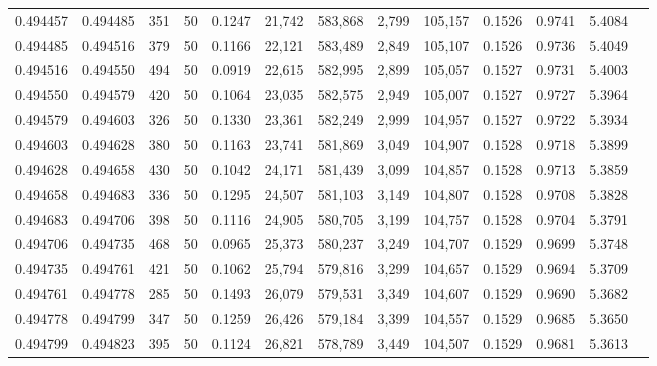\begin{tabular}{rrrrrrrrrrrrr}
0.494457 & 0.494485 & 351 &  50 &                                     0.1247 &  21,742 & 583,868 &   2,799 & 105,157 & 0.1526 & 0.9741 & 5.4084 \\
0.494485 & 0.494516 & 379 &  50 &                                     0.1166 &  22,121 & 583,489 &   2,849 & 105,107 & 0.1526 & 0.9736 & 5.4049 \\
0.494516 & 0.494550 & 494 &  50 &                                     0.0919 &  22,615 & 582,995 &   2,899 & 105,057 & 0.1527 & 0.9731 & 5.4003 \\
0.494550 & 0.494579 & 420 &  50 &                                     0.1064 &  23,035 & 582,575 &   2,949 & 105,007 & 0.1527 & 0.9727 & 5.3964 \\
0.494579 & 0.494603 & 326 &  50 &                                     0.1330 &  23,361 & 582,249 &   2,999 & 104,957 & 0.1527 & 0.9722 & 5.3934 \\
0.494603 & 0.494628 & 380 &  50 &                                     0.1163 &  23,741 & 581,869 &   3,049 & 104,907 & 0.1528 & 0.9718 & 5.3899 \\
0.494628 & 0.494658 & 430 &  50 &                                     0.1042 &  24,171 & 581,439 &   3,099 & 104,857 & 0.1528 & 0.9713 & 5.3859 \\
0.494658 & 0.494683 & 336 &  50 &                                     0.1295 &  24,507 & 581,103 &   3,149 & 104,807 & 0.1528 & 0.9708 & 5.3828 \\
0.494683 & 0.494706 & 398 &  50 &                                     0.1116 &  24,905 & 580,705 &   3,199 & 104,757 & 0.1528 & 0.9704 & 5.3791 \\
0.494706 & 0.494735 & 468 &  50 &                                     0.0965 &  25,373 & 580,237 &   3,249 & 104,707 & 0.1529 & 0.9699 & 5.3748 \\
0.494735 & 0.494761 & 421 &  50 &                                     0.1062 &  25,794 & 579,816 &   3,299 & 104,657 & 0.1529 & 0.9694 & 5.3709 \\
0.494761 & 0.494778 & 285 &  50 &                                     0.1493 &  26,079 & 579,531 &   3,349 & 104,607 & 0.1529 & 0.9690 & 5.3682 \\
0.494778 & 0.494799 & 347 &  50 &                                     0.1259 &  26,426 & 579,184 &   3,399 & 104,557 & 0.1529 & 0.9685 & 5.3650 \\
0.494799 & 0.494823 & 395 &  50 &                                     0.1124 &  26,821 & 578,789 &   3,449 & 104,507 & 0.1529 & 0.9681 & 5.3613 \\

\end{tabular}
